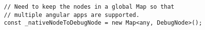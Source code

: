 \begin{verbatim}
// Need to keep the nodes in a global Map so that
// multiple angular apps are supported.
const _nativeNodeToDebugNode = new Map<any, DebugNode>();
\end{verbatim}
